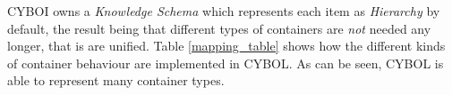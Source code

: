 CYBOI owns a \emph{Knowledge Schema} which represents each item as
\emph{Hierarchy} by default, the result being that different types of
containers are \emph{not} needed any longer, that is are unified. Table
\ref{mapping_table} shows how the different kinds of container behaviour are
implemented in CYBOL. As can be seen, CYBOL is able to represent many container
types.
